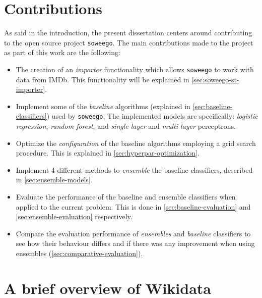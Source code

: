 \documentclass[epsfig,a4paper,11pt,titlepage,twoside,openany]{book}
\newcommand{\soweego}[0]{\texttt{soweego}\xspace}
\begin{document}
\section{Contributions}
\label{sec:contributions}

As said in the introduction, the present dissertation centers around contributing to the open source project \soweego. The  main contributions made to the project as part of this work are the following:

\begin{itemize}
    \item The creation of an \textit{importer} functionality which allows \soweego to work with data from IMDb. This functionality will be explained in \autoref{sec:soweego-st-importer}.
    
    \item Implement some of the \textit{baseline} algorithms (explained in \autoref{sec:baseline-classifiers}) used by \soweego. The implemented models are specifically: \textit{logistic regression}, \textit{random forest}, and \textit{single layer} and \textit{multi layer} perceptrons.
    
    \item Optimize the \textit{configuration} of the baseline algorithms employing a grid search procedure. This is explained in \autoref{sec:hyperpar-optimization}.
    
    \item Implement 4 different methods to \textit{ensemble} the baseline classifiers, described in \autoref{sec:ensemble-models}. 
    
    \item Evaluate the performance of the baseline and ensemble classifiers when applied to the current problem. This is done in \autoref{sec:baseline-evaluation} and \autoref{sec:ensemble-evaluation} respectively.
    
    \item Compare the evaluation performance of \textit{ensembles} and \textit{baseline} classifiers to see how their behaviour differs and if there was any improvement when using ensembles (\autoref{sec:comparative-evaluation}).
    
    
\end{itemize}




\section{A brief overview of Wikidata}
\label{sec:intro-wikidata}
\end{document}
